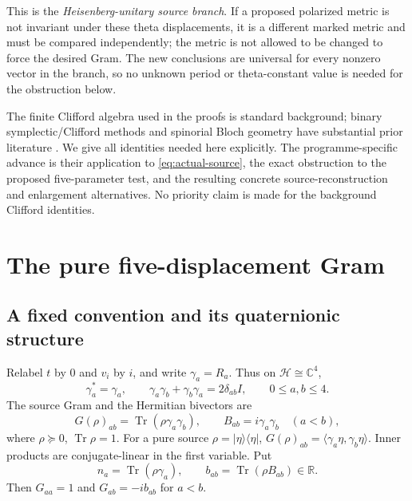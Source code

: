 \documentclass[11pt]{article}
\theoremstyle{definition}
\theoremstyle{remark}
\newcommand{\C}{\mathbb C}
\newcommand{\R}{\mathbb R}
\newcommand{\HH}{\mathcal H}
\newcommand{\Tr}{\operatorname{Tr}}
\newcommand{\ip}[2]{\langle#1,#2\rangle}
\newcommand{\ketbra}[1]{|#1\rangle\langle#1|}
\begin{document}
This is the \emph{Heisenberg-unitary source branch}. If a proposed polarized metric is not invariant under these theta displacements, it is a different marked metric and must be compared independently; the metric is not allowed to be changed to force the desired Gram. The new conclusions are universal for every nonzero vector in the branch, so no unknown period or theta-constant value is needed for the obstruction below.

The finite Clifford algebra used in the proofs is standard background; binary symplectic/Clifford methods and spinorial Bloch geometry have substantial prior literature \cite{DehaeneDeMoor,Hasebe}. We give all identities needed here explicitly. The programme-specific advance is their application to \eqref{eq:actual-source}, the exact obstruction to the proposed five-parameter test, and the resulting concrete source-reconstruction and enlargement alternatives. No priority claim is made for the background Clifford identities.

\section{The pure five-displacement Gram}
\label{sec:pure-gram}

\subsection{A fixed convention and its quaternionic structure}
Relabel $t$ by $0$ and $v_i$ by $i$, and write $\gamma_a=R_a$.
Thus on $\HH\cong\C^4$,
\begin{equation}
 \gamma_a^*=\gamma_a,\qquad
 \gamma_a\gamma_b+\gamma_b\gamma_a=2\delta_{ab}I,
 \qquad 0\le a,b\le4.
 \label{eq:clifford}
\end{equation}
The source Gram and the Hermitian bivectors are
\begin{equation}
 G(\rho)_{ab}=\Tr(\rho\gamma_a\gamma_b),\qquad
 B_{ab}=i\gamma_a\gamma_b\quad(a<b),
 \label{eq:gram-rho}
\end{equation}
where $\rho\succeq0$, $\Tr\rho=1$. For a pure source $\rho=\ketbra{\eta}$,
$G(\rho)_{ab}=\ip{\gamma_a\eta}{\gamma_b\eta}$. Inner products are conjugate-linear in the first variable. Put
\begin{equation}
 n_a=\Tr(\rho\gamma_a),\qquad b_{ab}=\Tr(\rho B_{ab})\in\R.
 \label{eq:n-b}
\end{equation}
Then $G_{aa}=1$ and $G_{ab}=-ib_{ab}$ for $a<b$.
\end{document}
